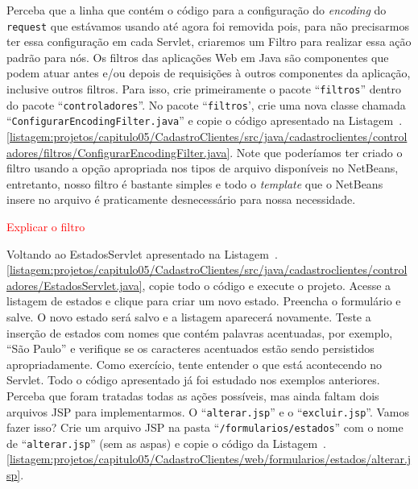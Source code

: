 Perceba que a linha que contém o código para a configuração do \textit{encoding} do \texttt{request} que estávamos usando até agora foi removida pois, para não precisarmos ter essa configuração em cada Servlet, criaremos um Filtro para realizar essa ação padrão para nós. Os filtros das aplicações Web em Java são componentes que podem atuar antes e/ou depois de requisições à outros componentes da aplicação, inclusive outros filtros. Para isso, crie primeiramente o pacote ``\texttt{filtros}'' dentro do pacote ``\texttt{controladores}''. No pacote ``\texttt{filtros}', crie uma nova classe chamada ``\texttt{ConfigurarEncodingFilter.java}'' e copie o código apresentado na Listagem~\thechapter.\ref{listagem:projetos/capitulo05/CadastroClientes/src/java/cadastroclientes/controladores/filtros/ConfigurarEncodingFilter.java}. Note que poderíamos ter criado o filtro usando a opção apropriada nos tipos de arquivo disponíveis no NetBeans, entretanto, nosso filtro é bastante simples e todo o \textit{template} que o NetBeans insere no arquivo é praticamente desnecessário para nossa necessidade.


\textcolor{red}{Explicar o filtro}

Voltando ao EstadosServlet apresentado na Listagem~\thechapter.\ref{listagem:projetos/capitulo05/CadastroClientes/src/java/cadastroclientes/controladores/EstadosServlet.java}, copie todo o código e execute o projeto. Acesse a listagem de estados e clique para criar um novo estado. Preencha o formulário e salve. O novo estado será salvo e a listagem aparecerá novamente. Teste a inserção de estados com nomes que contém palavras acentuadas, por exemplo, ``São Paulo'' e verifique se os caracteres acentuados estão sendo persistidos apropriadamente. Como exercício, tente entender o que está acontecendo no Servlet. Todo o código apresentado já foi estudado nos exemplos anteriores. Perceba que foram tratadas todas as ações possíveis, mas ainda faltam dois arquivos JSP para implementarmos. O ``\texttt{alterar.jsp}'' e o ``\texttt{excluir.jsp}''. Vamos fazer isso? Crie um arquivo JSP na pasta ``\texttt{/formularios/estados}'' com o nome de ``\texttt{alterar.jsp}'' (sem as aspas) e copie o código da Listagem~\thechapter.\ref{listagem:projetos/capitulo05/CadastroClientes/web/formularios/estados/alterar.jsp}.

